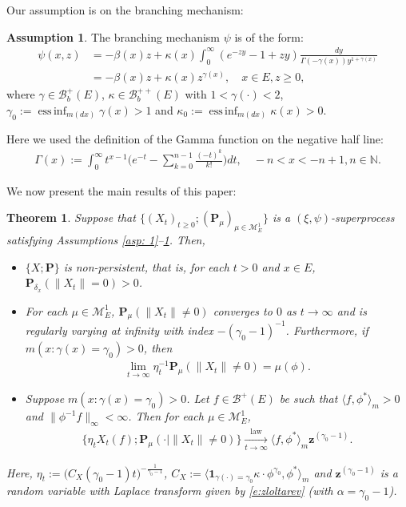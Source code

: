 \documentclass[12pt,a4paper]{amsart}
\newtheorem{thm}{Theorem}[section]
\theoremstyle{definition}
\newtheorem{asp}{Assumption}
\numberwithin{equation}{section}
\begin{document}
Our assumption is on the branching mechanism:
\begin{asp} \label{asp: 4}
	The branching mechanism $\psi$ is of the form:
  \begin{align}
    \psi(x,z)
    &= - \beta(x) z + \kappa(x) \int_0^\infty (e^{-z y} - 1+ z y) \frac{dy}{\Gamma(- \gamma(x)) y^{1+ \gamma(x)}}
    \\&= -\beta (x) z + \kappa(x) z^{\gamma(x)},
    \quad x\in E, z \geq 0,
\end{align}
where $\gamma \in \mathscr B^+_b(E)$, $\kappa \in \mathscr B^{++}_b(E)$ with $1< \gamma(\cdot )<2$, $\gamma_0 := \operatorname{ess\,inf}_{m(dx)} \gamma(x)> 1$ and $\kappa_0:=\operatorname{ess\,inf}_{m(dx)}\kappa(x) > 0$.
\end{asp}
Here we used the definition of the Gamma function on the negative half line:
\begin{align}\label{eq: definition of Gamma function}
  \Gamma(x)
  := \int_0^\infty t^{x-1} \Big(e^{-t} - \sum_{k=0}^{n-1} \frac{(-t)^k}{k!}\Big) dt,
  \quad -n< x< -n+1, n\in \mathbb N.
\end{align}
	
We now present the main results of this paper:
\begin{thm}
\label{thm: main theorem}
  Suppose that $\{(X_t)_{t\geq 0}; (\mathbf P_\mu)_{\mu \in \mathcal M_E^1}\}$ is a $(\xi, \psi)$-superprocess satisfying Assumptions \ref{asp: 1}--\ref{asp: 4}.
  Then,
  \begin{itemize}
  \item[(1)]
    $\{X; \mathbf P\}$ is non-persistent, that is, for each $t > 0$ and $x\in E$,
    $\mathbf P_{\delta_x}( \| X_t\| = 0) > 0$.
  \item[(2)]
    For each $\mu \in \mathcal M^1_E$, $\mathbf P_{\mu}(\|X_t\| \neq 0)$ converges to $0$ as $t \to \infty$ and is regularly varying at infinity with index $-(\gamma_0-1)^{-1}$.
    Furthermore, if $m(x: \gamma (x)= \gamma_0)>0$, then
    \begin{align}
      \lim_{t\to\infty} \eta_t^{-1}\mathbf P_{\mu}(\|X_t\| \neq 0)
      =\mu(\phi).
    \end{align}
  \item[(3)]
    Suppose $m( x:\gamma(x)=\gamma_0 )>0$.
    Let $f \in \mathscr B^+(E)$ be such that $\langle f, \phi^* \rangle_m > 0$ and $\| \phi^{-1}f \|_\infty < \infty$. Then for each $\mu \in \mathcal M_E^1$,
    \begin{align}
      \{\eta_t X_t(f) ; \mathbf P_{\mu}(\cdot |\|X_t\| \neq 0) \}
      \xrightarrow[t\to \infty]{\operatorname{law}} \langle f, \phi^*\rangle_m \mathbf z^{(\gamma_0 - 1)}.
    \end{align}
  \end{itemize}
  Here, $\eta_t := \big( C_X(\gamma_0 - 1) t \big)^{- \frac {1} {\gamma_0 - 1} }$, $C_X := \langle \mathbf 1_{\gamma(\cdot) = \gamma_0} \kappa\cdot \phi^{\gamma_0}, \phi^* \rangle_m$ and $\mathbf z^{(\gamma_0 - 1)}$ is a random variable with Laplace transform given by \eqref{e:zloltarev}
  (with $\alpha=\gamma_0 -1$).
\end{thm}
\end{document}
